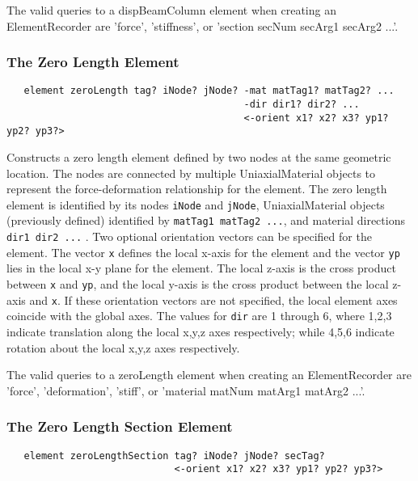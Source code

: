 \documentclass[12pt]{article}
\begin{document}
The valid queries to a dispBeamColumn element when creating an
ElementRecorder are 'force', 'stiffness', or 'section secNum
secArg1 secArg2 ...'.

\subsubsection{The Zero Length Element}
{\sf\small
\begin{verbatim}
   element zeroLength tag? iNode? jNode? -mat matTag1? matTag2? ...
                                         -dir dir1? dir2? ...
                                         <-orient x1? x2? x3? yp1? yp2? yp3?>
\end{verbatim}
}

\noindent Constructs a zero length element defined by two nodes at the
same geometric location. The nodes are connected by multiple
UniaxialMaterial objects to represent the force-deformation
relationship for the element. The zero length element is identified
by its nodes {\tt iNode} and {\tt jNode}, UniaxialMaterial objects
(previously defined) identified by {\tt matTag1 matTag2 ...}, and material
directions {\tt dir1 dir2 ...} . Two optional orientation vectors can be
specified for the element. The vector {\tt x} defines the local x-axis for
the element and the vector {\tt yp} lies in the local x-y plane for the
element. The local z-axis is the cross product between {\tt x} and {\tt yp},
and the local y-axis is the cross product between the local z-axis and
{\tt x}. If these orientation vectors are not specified, the local element
axes coincide with the global axes. The values for {\tt dir} are 1 through 6,
where 1,2,3 indicate translation along the local x,y,z axes
respectively; while 4,5,6 indicate rotation about the local x,y,z axes
respectively. 

The valid queries to a zeroLength element when creating an ElementRecorder
are 'force', 'deformation', 'stiff', or 'material matNum matArg1 matArg2 ...'.

\subsubsection{The Zero Length Section Element}
{\sf\small
\begin{verbatim}
   element zeroLengthSection tag? iNode? jNode? secTag?
                             <-orient x1? x2? x3? yp1? yp2? yp3?>
\end{verbatim}
}
\end{document}
